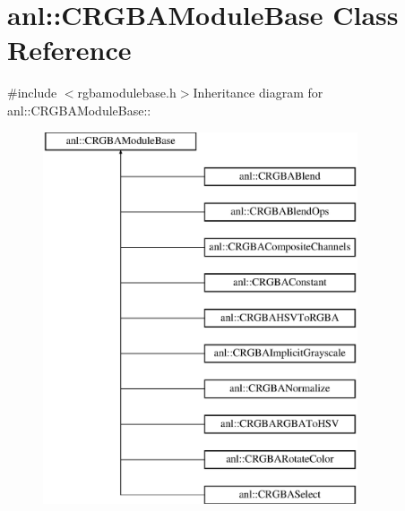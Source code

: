 \hypertarget{classanl_1_1CRGBAModuleBase}{
\section{anl::CRGBAModuleBase Class Reference}
\label{classanl_1_1CRGBAModuleBase}
}


{\ttfamily \#include $<$rgbamodulebase.h$>$}Inheritance diagram for anl::CRGBAModuleBase::\begin{figure}[H]
\begin{center}
\leavevmode
\includegraphics[height=11cm]{classanl_1_1CRGBAModuleBase}
\end{center}
\end{figure}
